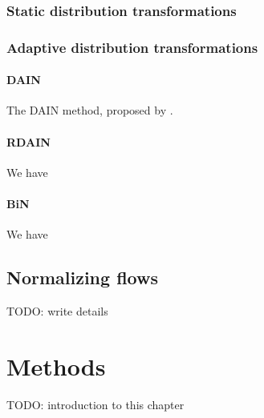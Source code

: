 \documentclass{statsmsc}
\begin{document}
\subsection{Static distribution transformations}%
\label{sub:Static distribution transformations}



\subsection{Adaptive distribution transformations}%
\label{sub:Adaptive distribution transformations}

\subsubsection{DAIN}%
\label{ssub:DAIN}

The \ac{DAIN} method, proposed by \cite{dain}.

\subsubsection{RDAIN}%
\label{ssub:RDAIN}

We have \cite{rdain}

\subsubsection{BiN}%
\label{ssub:BiN}

We have \cite{bin}





\section{Normalizing flows}%
\label{sec:Normalizing flows}

TODO: write details



\chapter{Methods} %

TODO: introduction to this chapter
\end{document}
